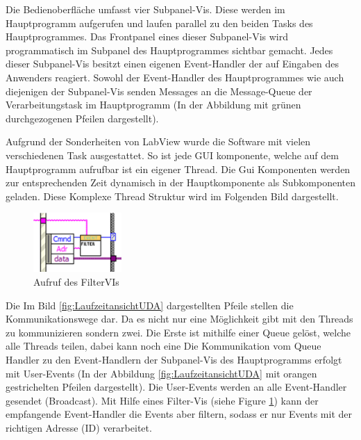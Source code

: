 \documentclass[10pt]{scrartcl}
\begin{document}
Die Bedienoberfläche umfasst vier Subpanel-Vis. Diese werden im Hauptprogramm aufgerufen und laufen parallel zu den beiden Tasks des Hauptprogrammes. Das Frontpanel eines dieser Subpanel-Vis wird programmatisch im Subpanel des Hauptprogrammes sichtbar gemacht.  
Jedes dieser Subpanel-Vis besitzt einen eigenen Event-Handler der auf Eingaben des Anwenders reagiert. Sowohl der Event-Handler des Hauptprogrammes wie auch diejenigen der Subpanel-Vis senden Messages an die Message-Queue der Verarbeitungstask im Hauptprogramm (In der Abbildung mit grünen durchgezogenen Pfeilen dargestellt).

Aufgrund der Sonderheiten von LabView wurde die Software mit vielen verschiedenen Task ausgestattet. So ist jede GUI komponente, welche auf dem Hauptprogramm aufrufbar ist ein eigener Thread. Die Gui Komponenten werden zur entsprechenden Zeit dynamisch in der Hauptkomponente als Subkomponenten geladen. Diese Komplexe Thread Struktur wird im Folgenden Bild dargestellt.


\begin{figure}
	\begin{center}
		\includegraphics[width=0.3\textwidth]{filterVI}
		\caption{Aufruf des FilterVIs}
		\label{fig:filterVI}
	\end{center}
\end{figure}
Die Im Bild \ref{fig:LaufzeitansichtUDA} dargestellten Pfeile stellen die Kommunikationswege dar. Da es nicht nur eine Möglichkeit gibt mit den Threads zu kommunizieren sondern zwei. Die Erste ist mithilfe einer Queue gelöst, welche alle Threads teilen, dabei kann noch eine
Die Kommunikation vom Queue Handler zu den Event-Handlern der Subpanel-Vis des Hauptprogramms erfolgt mit User-Events (In der Abbildung \ref{fig:LaufzeitansichtUDA} mit orangen gestrichelten Pfeilen dargestellt). Die User-Events werden an alle Event-Handler gesendet (Broadcast). Mit Hilfe eines Filter-Vis (siehe Figure \ref{fig:filterVI}) kann der empfangende Event-Handler die Events aber filtern, sodass er nur Events mit der richtigen Adresse (ID) verarbeitet.
\end{document}
